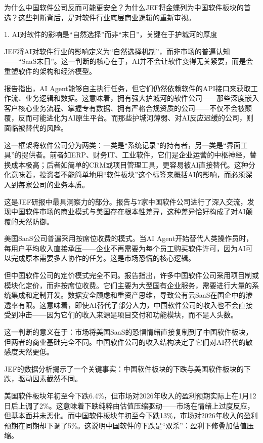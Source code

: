 \documentclass[11pt]{ctexart}
\begin{document}
为什么中国软件公司反而可能更安全？为什么JEF将金蝶列为中国软件板块的首选？这些判断背后，是对软件行业底层商业逻辑的重新审视。

1. AI对软件的影响是“自然选择”而非“末日”，关键在于护城河的厚度

JEF将AI对软件行业的影响定义为“自然选择机制”，而非市场的普遍认知——“SaaS末日”。这一判断的核心在于，AI并不会让软件变得无关紧要，而是会重塑软件的架构和经济模型。

报告指出，AI Agent能够自主执行任务，但它们仍然依赖软件的API接口来获取工作流、业务逻辑和数据。这意味着，拥有强大护城河的软件公司——那些深度嵌入客户核心业务流程、掌握专有数据、拥有严格合规资质的公司——不仅不会被颠覆，反而可能进化为AI原生平台。而那些护城河薄弱、对AI反应迟缓的公司，则面临被替代的风险。

这一框架将软件公司分为两类：一类是“系统记录”的持有者，另一类是“界面工具”的提供者。前者如ERP、财务IT、工业软件，它们是企业运营的中枢神经，替换成本极高；后者如简单的CRM或项目管理工具，更容易被AI直接替代。这种分化意味着，投资者不能简单地用“软件板块”这个标签来概括AI的影响，而必须深入到每家公司的业务本质。

这是JEF研报中最具洞察力的部分。报告与7家中国软件公司进行了深入交流，发现中国软件市场的商业模式与美国存在根本性差异，这种差异恰好构成了对AI颠覆的天然防御。

美国SaaS公司普遍采用按席位收费的模式。当AI Agent开始替代人类操作员时，每用户平均收入直接承压——企业不再需要为每个员工购买软件许可，因为AI可以完成原本需要多人协作的任务。这是市场恐慌的核心逻辑。

但中国软件公司的定价模式完全不同。报告指出，许多中国软件公司采用项目制或模块化定价，而非按席位收费。它们主要为大型国有企业服务，需要进行大量的系统集成和定制开发。数据安全顾虑和重资产思维，导致公有云SaaS在国企中的渗透率有限。这意味着，即使AI替代了部分人力，中国软件公司的收入也不会直接受到冲击——因为它们的收入来源是项目交付和功能模块，而不是人头数。

这一判断的意义在于：市场将美国SaaS的恐惧情绪直接复制到了中国软件板块，但两者的商业基础完全不同。中国软件公司的收入结构决定了它们对AI替代的敏感度天然更低。

JEF的数据分析揭示了一个关键事实：中国软件板块的下跌与美国软件板块的下跌，驱动因素截然不同。

美国软件板块年初至今下跌6.4\%，但市场对2026年收入的盈利预期实际上在1月12日后上调了2\%。这意味着下跌纯粹由估值压缩驱动——市场在情绪上过度反应，但基本面并未恶化。而中国软件板块年初至今下跌13\%，市场对2026年收入的盈利预期在同期却下调了5\%。这说明中国软件的下跌是“双杀”：盈利下修叠加估值压缩。
\end{document}
